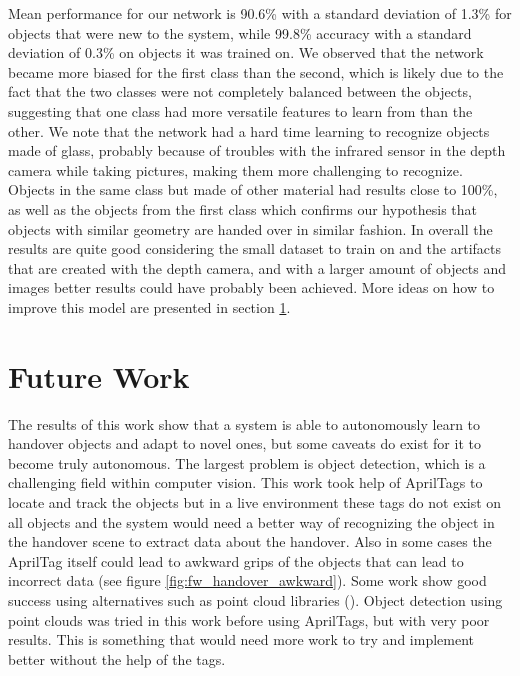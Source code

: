 Mean performance for our network is 90.6\% with a standard deviation of 1.3\% for objects that were new to the system, while 99.8\% accuracy with a standard deviation of 0.3\% on objects it was trained on. We observed that the network became more biased for the first class than the second, which is likely due to the fact that the two classes were not completely balanced between the objects, suggesting that one class had more versatile features to learn from than the other. We note that the network had a hard time learning to recognize objects made of glass, probably because of troubles with the infrared sensor in the depth camera while taking pictures, making them more challenging to recognize. Objects in the same class but made of other material had results close to 100\%, as well as the objects from the first class which confirms our hypothesis that objects with similar geometry are handed over in similar fashion. In overall the results are quite good considering the small dataset to train on and the artifacts that are created with the depth camera, and with a larger amount of objects and images better results could have probably been achieved. More ideas on how to improve this model are presented in section \ref{sec:future-work}.

\section{Future Work}
\label{sec:future-work}

The results of this work show that a system is able to autonomously learn to handover objects and adapt to novel ones, but some caveats do exist for it to become truly autonomous. The largest problem is object detection, which is a challenging field within computer vision. This work took help of AprilTags to locate and track the objects but in a live environment these tags do not exist on all objects and the system would need a better way of recognizing the object in the handover scene to extract data about the handover. Also in some cases the AprilTag itself could lead to awkward grips of the objects that can lead to incorrect data (see figure \ref{fig:fw_handover_awkward}). Some work show good success using alternatives such as point cloud libraries (\parencite{Chan2015a}). Object detection using point clouds was tried in this work before using AprilTags, but with very poor results. This is something that would need more work to try and implement better without the help of the tags.

